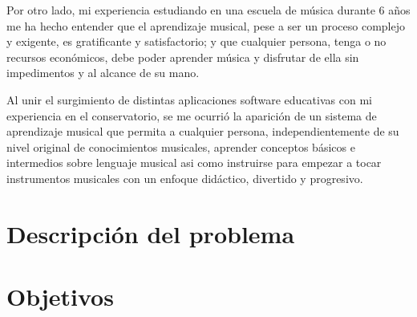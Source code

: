 Por otro lado, mi experiencia estudiando en una escuela de música durante 6 años me ha hecho entender que el aprendizaje musical, pese a ser un proceso complejo y exigente,
es gratificante y satisfactorio; y que cualquier persona, tenga o no recursos económicos, debe poder aprender música y disfrutar de ella sin impedimentos y al alcance de su mano.

Al unir el surgimiento de distintas aplicaciones software educativas con mi experiencia en el conservatorio, se me ocurrió
la aparición de un sistema de aprendizaje musical que permita a cualquier persona, independientemente
de su nivel original de conocimientos musicales, aprender conceptos básicos e intermedios sobre lenguaje musical asi como
instruirse para empezar a tocar instrumentos musicales con un enfoque didáctico, divertido y progresivo.



\section{Descripción del problema}



\section{Objetivos}

